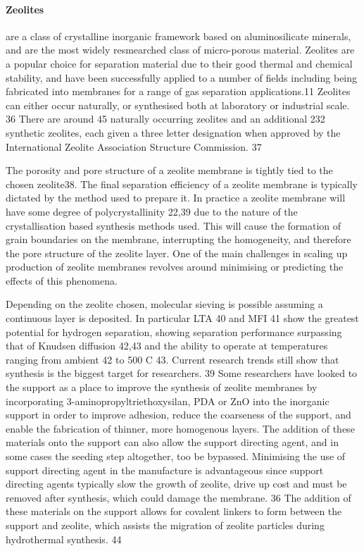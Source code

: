 \paragraph{Zeolites} are a class of crystalline inorganic framework based on aluminosilicate minerals, 
and are the most widely resmearched class of micro-porous material. Zeolites are a popular 
choice for separation material due to their good thermal and chemical stability, and have 
been successfully applied to a number of fields including being fabricated into membranes 
for a range of gas separation applications.11 Zeolites can either occur naturally, or 
synthesised both at laboratory or industrial scale. 36  There are around 45 naturally 
occurring zeolites and an additional 232 synthetic zeolites, each given a three letter 
designation when approved by the International Zeolite Association Structure Commission. 37

The porosity and pore structure of a zeolite membrane is tightly tied to the chosen zeolite38. 
The final separation efficiency of a zeolite membrane is typically dictated by the method 
used to prepare it. In practice a zeolite membrane will have some degree of polycrystallinity 22,39 
due to the nature of the crystallisation based synthesis methods used. 
This will cause the formation of grain boundaries on the membrane, interrupting the 
homogeneity, and therefore the pore structure of the zeolite layer. One of the main 
challenges in scaling up production of zeolite membranes revolves around minimising or 
predicting the effects of this phenomena. 

Depending on the zeolite chosen, molecular sieving is possible assuming a continuous layer is 
deposited. In particular LTA 40 and MFI 41 show the greatest potential for hydrogen separation, 
showing separation performance surpassing that of Knudsen diffusion 42,43 and the ability to 
operate at temperatures ranging from ambient 42 to 500 \textdegree C 43. Current research 
trends still show that synthesis is the biggest target for researchers. 39 Some researchers 
have looked to 
the support as a place to improve the synthesis of zeolite membranes by incorporating 
3-aminopropyltriethoxysilan, PDA or ZnO into the inorganic support in order to improve 
adhesion, reduce the coarseness of the support, and enable the fabrication of thinner, 
more homogenous layers. The addition of these materials onto the support can also allow the 
support directing agent, and in some cases the seeding step altogether, too be bypassed. 
Minimising the use of support directing agent in the manufacture is advantageous since 
support directing agents typically slow the growth of zeolite, drive up cost and must be 
removed after synthesis, which could damage the membrane. 36 The addition of these materials 
on the support allows for covalent linkers to form between the support and zeolite, which 
assists the migration of zeolite particles during hydrothermal synthesis. 44

